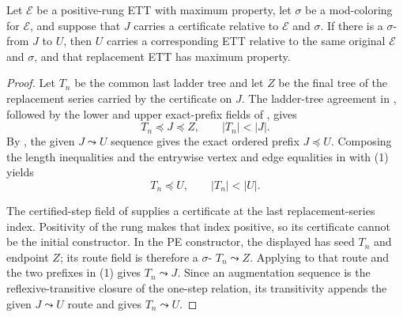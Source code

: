 \begin{helper}
Let $\mathcal E$ be a positive-rung ETT with maximum property, let
$\sigma$ be a mod-coloring for $\mathcal E$, and suppose that $J$ carries
a  certificate relative to
$\mathcal E$ and $\sigma$.  If there is a
$\sigma$- from $J$ to $U$, then
$U$ carries a corresponding ETT relative to the same original
$\mathcal E$ and $\sigma$, and that replacement ETT has maximum property.
\end{helper}
\begin{proof}
Let $T_n$ be the common last ladder tree and let $Z$ be the final tree of
the replacement series carried by the certificate on $J$.  The ladder-tree
agreement in , followed by the
lower and upper exact-prefix fields of
, gives
\[
 T_n\preccurlyeq J\preccurlyeq Z,
 \qquad |T_n|<|J|.                                      \tag{1}
\]
By , the given
$J\leadsto U$ sequence gives the exact ordered prefix
$J\preccurlyeq U$.  Composing the length inequalities and the entrywise
vertex and edge equalities in  with
(1) yields
\[
 T_n\preccurlyeq U,
 \qquad |T_n|<|U|.                                      \tag{2}
\]

The certified-step field of  supplies a
 certificate at the last replacement-series
index.  Positivity of the rung makes that index positive, so its certificate
cannot be the initial constructor.  In the PE constructor, the displayed
 has seed $T_n$ and endpoint $Z$; its route field
is therefore a $\sigma$-
$T_n\leadsto Z$.  Applying
 to that route and the two
prefixes in (1) gives $T_n\leadsto J$.  Since an augmentation sequence is
the reflexive-transitive closure of the one-step relation, its transitivity
appends the given $J\leadsto U$ route and gives
$T_n\leadsto U$.                                         


\end{proof}
